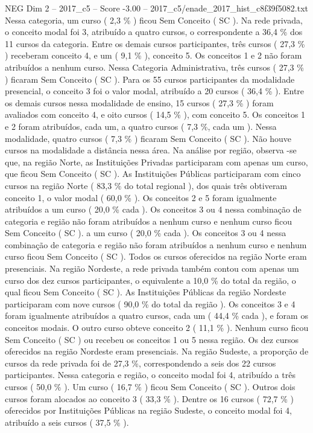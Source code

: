 \begin{textsample}{NEG Dim 2 – 2017\_c5 – Score -3.00 – 2017\_c5/enade\_2017\_hist\_c8f39f5082.txt}
Nessa categoria, um curso ( 2,3 \% ) ficou Sem Conceito ( SC ).
Na rede privada, o conceito modal foi 3, atribuído a quatro cursos, o correspondente a 36,4 \% dos 11 cursos da categoria.
Entre os demais cursos participantes, três cursos ( 27,3 \% ) receberam conceito 4, e um ( 9,1 \% ), conceito 5.
Os conceitos 1 e 2 não foram atribuídos a nenhum curso.
Nessa Categoria Administrativa, três cursos ( 27,3 \% ) ficaram Sem Conceito ( SC ).
Para os 55 cursos participantes da modalidade presencial, o conceito 3 foi o valor modal, atribuído a 20 cursos ( 36,4 \% ).
Entre os demais cursos nessa modalidade de ensino, 15 cursos ( 27,3 \% ) foram avaliados com conceito 4, e oito cursos ( 14,5 \% ), com conceito 5.
Os conceitos 1 e 2 foram atribuídos, cada um, a quatro cursos ( 7,3 \%, cada um ).
Nessa modalidade, quatro cursos ( 7,3 \% ) ficaram Sem Conceito ( SC ).
Não houve cursos na modalidade a distância nessa área.
Na análise por região, observa -se que, na região Norte, as Instituições Privadas participaram com apenas um curso, que ficou Sem Conceito ( SC ).
As Instituições Públicas participaram com cinco cursos na região Norte ( 83,3 \% do total regional ), dos quais três obtiveram conceito 1, o valor modal ( 60,0 \% ).
Os conceitos 2 e 5 foram igualmente atribuídos a um curso ( 20,0 \% cada ).
Os conceitos 3 ou 4 nessa combinação de categoria e região não foram atribuídos a nenhum curso e nenhum curso ficou Sem Conceito ( SC ). a um curso ( 20,0 \% cada ).
Os conceitos 3 ou 4 nessa combinação de categoria e região não foram atribuídos a nenhum curso e nenhum curso ficou Sem Conceito ( SC ).
Todos os cursos oferecidos na região Norte eram presenciais.
Na região Nordeste, a rede privada também contou com apenas um curso dos dez cursos participantes, o equivalente a 10,0 \% do total da região, o qual ficou Sem Conceito ( SC ).
As Instituições Públicas da região Nordeste participaram com nove cursos ( 90,0 \% do total da região ).
Os conceitos 3 e 4 foram igualmente atribuídos a quatro cursos, cada um ( 44,4 \% cada ), e foram os conceitos modais.
O outro curso obteve conceito 2 ( 11,1 \% ).
Nenhum curso ficou Sem Conceito ( SC ) ou recebeu os conceitos 1 ou 5 nessa região.
Os dez cursos oferecidos na região Nordeste eram presenciais.
Na região Sudeste, a proporção de cursos da rede privada foi de 27,3 \%, correspondendo a seis dos 22 cursos participantes.
Nessa categoria e região, o conceito modal foi 4, atribuído a três cursos ( 50,0 \% ).
Um curso ( 16,7 \% ) ficou Sem Conceito ( SC ).
Outros dois cursos foram alocados ao conceito 3 ( 33,3 \% ).
Dentre os 16 cursos ( 72,7 \% ) oferecidos por Instituições Públicas na região Sudeste, o conceito modal foi 4, atribuído a seis cursos ( 37,5 \% ).

\end{textsample}

